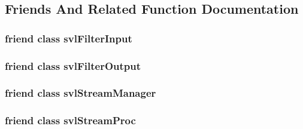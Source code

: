 \subsection{Friends And Related Function Documentation}
\hypertarget{classsvl_filter_base_a06b5f90c7191f0b22855f56d089948fa}{
\subsubsection[{svl\-Filter\-Input}]{\setlength{\rightskip}{0pt plus 5cm}friend class {\bf svl\-Filter\-Input}\hspace{0.3cm}{\ttfamily [friend]}}}\label{classsvl_filter_base_a06b5f90c7191f0b22855f56d089948fa}
\hypertarget{classsvl_filter_base_a3f45c3511fc124d190c8ffb5953025f6}{
\subsubsection[{svl\-Filter\-Output}]{\setlength{\rightskip}{0pt plus 5cm}friend class {\bf svl\-Filter\-Output}\hspace{0.3cm}{\ttfamily [friend]}}}\label{classsvl_filter_base_a3f45c3511fc124d190c8ffb5953025f6}
\hypertarget{classsvl_filter_base_ab5eee58544f2ce644140e932afbe32db}{
\subsubsection[{svl\-Stream\-Manager}]{\setlength{\rightskip}{0pt plus 5cm}friend class {\bf svl\-Stream\-Manager}\hspace{0.3cm}{\ttfamily [friend]}}}\label{classsvl_filter_base_ab5eee58544f2ce644140e932afbe32db}
\hypertarget{classsvl_filter_base_a6a9ee1dec5ca263793dca09411295245}{
\subsubsection[{svl\-Stream\-Proc}]{\setlength{\rightskip}{0pt plus 5cm}friend class {\bf svl\-Stream\-Proc}\hspace{0.3cm}{\ttfamily [friend]}}}\label{classsvl_filter_base_a6a9ee1dec5ca263793dca09411295245}


